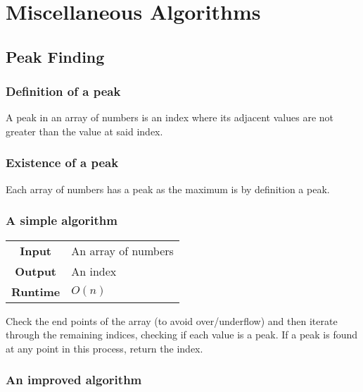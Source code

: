 \documentclass[a4paper, 12pt, twoside]{article}
\begin{document}
\newpage

\section{Miscellaneous Algorithms}

\subsection{Peak Finding}

\subsubsection{Definition of a peak}

A peak in an array of numbers is an index where its adjacent
values are not greater than the value at said index.

\subsubsection{Existence of a peak}

Each array of numbers has a peak as the maximum is by definition
a peak.

\subsubsection{A simple algorithm}

\begin{center}
      \begin{tabular}{ || c | p{8.5cm} || }
            \hline
                  \textbf{Input} & An array of numbers \\
                  \textbf{Output} & An index \\
            \hline\hline
                  \textbf{Runtime} & $O(n)$ \\
            \hline
      \end{tabular}
\end{center}

Check the end points of the array (to avoid over/underflow)
and then iterate through the remaining indices, checking if each
value is a peak. If a peak is found at any point in this process,
return the index.

\subsubsection{An improved algorithm}
\end{document}
